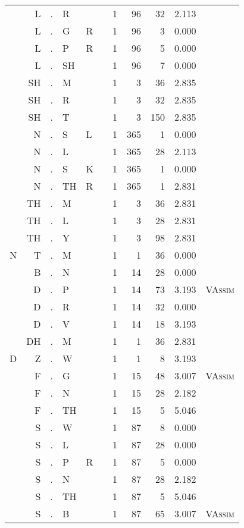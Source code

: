 \begin{longtable}{r@{ } r@{ } c@{ } l@{ } l@{ } l@{ } r r r r l }
 & L & . & R &  &  & 1 & 96 & 32 & 2.113 &  \\
 & L & . & G & R &  & 1 & 96 & 3 & 0.000 &  \\
 & L & . & P & R &  & 1 & 96 & 5 & 0.000 &  \\
 & L & . & SH &  &  & 1 & 96 & 7 & 0.000 &  \\
 & SH & . & M &  &  & 1 & 3 & 36 & 2.835 &  \\
 & SH & . & R &  &  & 1 & 3 & 32 & 2.835 &  \\
 & SH & . & T &  &  & 1 & 3 & 150 & 2.835 &  \\
 & N & . & S & L &  & 1 & 365 & 1 & 0.000 &  \\
 & N & . & L &  &  & 1 & 365 & 28 & 2.113 &  \\
 & N & . & S & K &  & 1 & 365 & 1 & 0.000 &  \\
 & N & . & TH & R &  & 1 & 365 & 1 & 2.831 &  \\
 & TH & . & M &  &  & 1 & 3 & 36 & 2.831 &  \\
 & TH & . & L &  &  & 1 & 3 & 28 & 2.831 &  \\
 & TH & . & Y &  &  & 1 & 3 & 98 & 2.831 &  \\
N & T & . & M &  &  & 1 & 1 & 36 & 0.000 &  \\
 & B & . & N &  &  & 1 & 14 & 28 & 0.000 &  \\
 & D & . & P &  &  & 1 & 14 & 73 & 3.193 & \textsc{VAssim} \\
 & D & . & R &  &  & 1 & 14 & 32 & 0.000 &  \\
 & D & . & V &  &  & 1 & 14 & 18 & 3.193 &  \\
 & DH & . & M &  &  & 1 & 1 & 36 & 2.831 &  \\
D & Z & . & W &  &  & 1 & 1 & 8 & 3.193 &  \\
 & F & . & G &  &  & 1 & 15 & 48 & 3.007 & \textsc{VAssim} \\
 & F & . & N &  &  & 1 & 15 & 28 & 2.182 &  \\
 & F & . & TH &  &  & 1 & 15 & 5 & 5.046 &  \\
 & S & . & W &  &  & 1 & 87 & 8 & 0.000 &  \\
 & S & . & L &  &  & 1 & 87 & 28 & 0.000 &  \\
 & S & . & P & R &  & 1 & 87 & 5 & 0.000 &  \\
 & S & . & N &  &  & 1 & 87 & 28 & 2.182 &  \\
 & S & . & TH &  &  & 1 & 87 & 5 & 5.046 &  \\
 & S & . & B &  &  & 1 & 87 & 65 & 3.007 & \textsc{VAssim} \\

\end{longtable}
